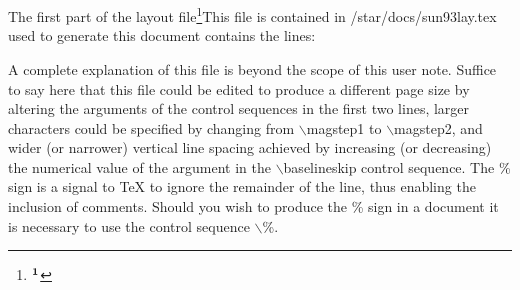 The first part of the layout file\footnote{$\bf^1$}{This file is
contained in /star/docs/sun93lay.tex} used to generate this document
contains the lines:
\medskip
\tt
{}


\rm
A complete explanation of this file is beyond the scope of this
user note.
Suffice to say here that this file could be edited to produce a different
page size by altering the arguments of the control sequences in the first two
lines, larger characters could be specified by changing from $\backslash$magstep1 to
$\backslash$magstep2, and wider (or narrower) vertical line spacing achieved 
by increasing
(or decreasing) the numerical value of the argument in the
$\backslash$baselineskip control sequence. 
The \% sign is a signal to {\TeX} to ignore the remainder of the line, 
thus enabling the inclusion of comments.
Should you wish to produce the \% sign in a document it is necessary to use the
control sequence $\backslash$\%.

